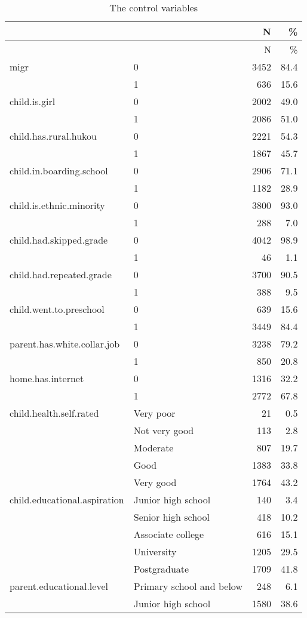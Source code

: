 \documentclass[
  man,floatsintext]{apa7}
\begin{document}
\begin{longtable}[]{@{}llrr@{}}
\caption{The control variables}\tabularnewline
\toprule
& & N & \% \\
\midrule
\endfirsthead
\toprule
& & N & \% \\
\midrule
\endhead
migr & 0 & 3452 & 84.4 \\
& 1 & 636 & 15.6 \\
child.is.girl & 0 & 2002 & 49.0 \\
& 1 & 2086 & 51.0 \\
child.has.rural.hukou & 0 & 2221 & 54.3 \\
& 1 & 1867 & 45.7 \\
child.in.boarding.school & 0 & 2906 & 71.1 \\
& 1 & 1182 & 28.9 \\
child.is.ethnic.minority & 0 & 3800 & 93.0 \\
& 1 & 288 & 7.0 \\
child.had.skipped.grade & 0 & 4042 & 98.9 \\
& 1 & 46 & 1.1 \\
child.had.repeated.grade & 0 & 3700 & 90.5 \\
& 1 & 388 & 9.5 \\
child.went.to.preschool & 0 & 639 & 15.6 \\
& 1 & 3449 & 84.4 \\
parent.has.white.collar.job & 0 & 3238 & 79.2 \\
& 1 & 850 & 20.8 \\
home.has.internet & 0 & 1316 & 32.2 \\
& 1 & 2772 & 67.8 \\
child.health.self.rated & Very poor & 21 & 0.5 \\
& Not very good & 113 & 2.8 \\
& Moderate & 807 & 19.7 \\
& Good & 1383 & 33.8 \\
& Very good & 1764 & 43.2 \\
child.educational.aspiration & Junior high school & 140 & 3.4 \\
& Senior high school & 418 & 10.2 \\
& Associate college & 616 & 15.1 \\
& University & 1205 & 29.5 \\
& Postgraduate & 1709 & 41.8 \\
parent.educational.level & Primary school and below & 248 & 6.1 \\
& Junior high school & 1580 & 38.6 \\

\end{longtable}
\end{document}
